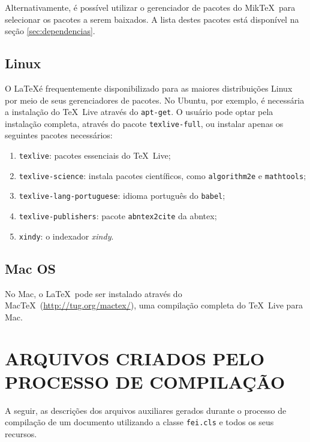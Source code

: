 \documentclass[xindy,rascunho]{fei}
\begin{document}
\begin{teorema}
	Alternativamente, é possível utilizar o gerenciador de pacotes do Mik\TeX\ para selecionar os pacotes a serem baixados. A lista destes pacotes está disponível na seção \ref{sec:dependencias}.
	
	\section{Linux}
	
	O \LaTeX é frequentemente disponibilizado para as maiores distribuições Linux por meio de seus gerenciadores de pacotes. No Ubuntu, por exemplo, é necessária a instalação do \TeX\ Live através do \texttt{apt-get}. O usuário pode optar pela instalação completa, através do pacote \texttt{texlive-full}, ou instalar apenas os seguintes pacotes necessários:
	
	\begin{enumerate}
	\item \texttt{texlive}: pacotes essenciais do \TeX\ Live;
	\item \texttt{texlive-science}: instala pacotes científicos, como \texttt{algorithm2e} e \texttt{mathtools};
	\item \texttt{texlive-lang-portuguese}: idioma português do \texttt{babel};
	\item \texttt{texlive-publishers}: pacote \texttt{abntex2cite} da \gls{abntex};
	\item {}\texttt{xindy}: o indexador \emph{xindy}.
	\end{enumerate}

	\section{Mac OS}
	
	No Mac, o \LaTeX\ pode ser instalado através do Mac\TeX\ (\url{http://tug.org/mactex/}), uma compilação completa do \TeX\ Live para Mac.

	
	
	\appendix
	
	\chapter{ARQUIVOS CRIADOS PELO PROCESSO DE COMPILAÇÃO} \label{chap:arquivos}
	
	A seguir, as descrições dos arquivos auxiliares gerados durante o processo de compilação de um documento utilizando a classe \texttt{fei.cls} e todos os seus recursos.
		

\end{teorema}
\end{document}
